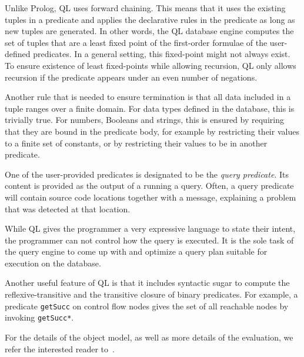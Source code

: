 Unlike Prolog, QL uses forward chaining.
This means that it uses the existing tuples in a predicate and applies the declarative
rules in the predicate as long as new tuples are generated.
In other words, the QL database engine computes the set of tuples that are a least fixed point 
of the first-order formulae of the user-defined predicates.
In a general setting, this fixed-point might not always exist.
To ensure existence of least fixed-points while allowing recursion,
QL only allows recursion if the predicate appears under an even number of negations.

Another rule that is needed to ensure termination is that all data included in a tuple 
ranges over a finite domain.
For data types defined in the database, this is trivially true.
For numbers, Booleans and strings, this is ensured by requiring that they are bound 
in the predicate body, for example by restricting their values to a finite set of constants,
or by restricting their values to be in another predicate.

One of the user-provided predicates is designated to be the \emph{query predicate}.
Its content is provided as the output of a running a query.
Often, a query predicate will contain source code locations together with a message,
explaining a problem that was detected at that location.

While QL gives the programmer a very expressive language to state their intent,
the programmer can not control how the query is executed.
It is the sole task of the query engine to come up with and optimize a 
query plan suitable for execution on the database.

Another useful feature of QL is that it includes syntactic sugar to compute the reflexive-transitive
and the transitive closure of binary predicates.
For example, a predicate \texttt{getSucc} on control flow nodes gives the set of all reachable
nodes by invoking \texttt{getSucc*}.

For the details of the object model, as well as more details of the evaluation, we refer
the interested reader to~\cite{qlpaper}.
